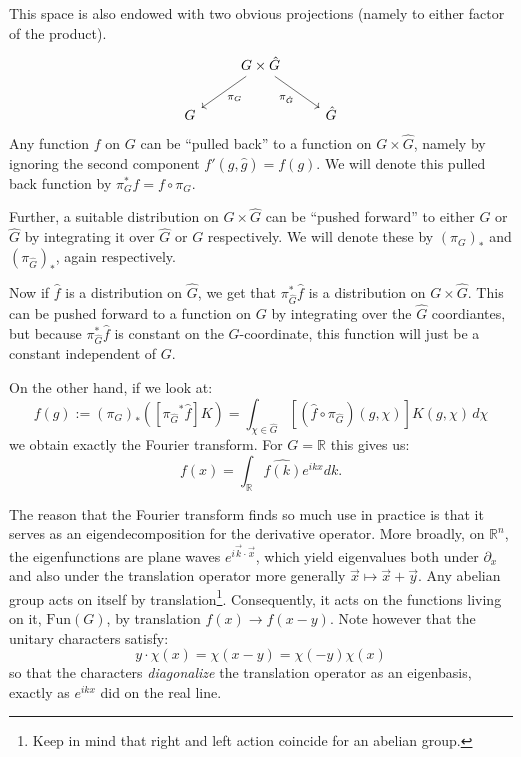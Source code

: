 		This space is also endowed with two obvious projections (namely to either factor of the product).		
		\[
		\begin{tikzcd}
		  & G \times \hat G \arrow[ld,"\pi_G"] \arrow[rd,swap,"\pi_{\hat G}"]&\\
		G & & \hat G
		\end{tikzcd}
		\]
		Any function $f$ on $G$ can be ``pulled back'' to a function on $G \times \hat G$, namely by ignoring the second component $f'(g, \hat g) = f(g)$. We will denote this pulled back function by $\pi_{G}^* f = f \circ \pi_G$.
		
		Further, a suitable distribution on $G \times \hat G$ can be ``pushed forward'' to either $G$ or $\hat G$ by integrating it over $\hat G$ or $G$ respectively. We will denote these by $(\pi_G)_*$ and $(\pi_{\hat G})_*$, again respectively.
		
		Now if $\hat f$ is a distribution on $\hat G$, we get that $\pi_{\hat G}^* \hat f$ is a distribution on $G \times \hat G$. This can be pushed forward to a function on $G$ by integrating over the $\hat G$ coordiantes, but because $\pi_{\hat G}^* \hat f$ is constant on the $G$-coordinate, this function will just be a constant independent of $G$.
		
		On the other hand, if we look at:
		\begin{equation}
			f (g) := {(\pi_{G})}_* ([{\pi_{\hat G}}^* \hat f] K) = \int_{\chi \in \hat G} [(\hat f \circ \pi_{\hat G}) (g, \chi)] K(g, \chi)\, d\chi
		\end{equation}
		we obtain exactly the Fourier transform. For $G = \mathbb R$ this gives us:
		\begin{equation}
			f(x) = \int_{\mathbb R} \widehat{f(k)} e^{ikx} dk.
		\end{equation}
		
		The reason that the Fourier transform finds so much use in practice is that it serves as an eigendecomposition for the derivative operator. More broadly, on $\mathbb R^n$, the eigenfunctions are plane waves $e^{i\vec k \cdot \vec x}$, which yield eigenvalues both under $\partial_x$ and also under the translation operator more generally $\vec x \mapsto \vec x + \vec y$. Any abelian group acts on itself by translation\footnote{Keep in mind that right and left action coincide for an abelian group.}. Consequently, it acts on the functions living on it, $\mathrm{Fun}(G)$, by translation $f(x) \to f(x - y)$. Note however that the unitary characters satisfy:
		\begin{equation}
			y \cdot \chi(x) = \chi(x - y) = \chi(-y) \chi(x)
		\end{equation}
		so that the characters \emph{diagonalize} the translation operator as an eigenbasis, exactly as $e^{ikx}$ did on the real line.
		
